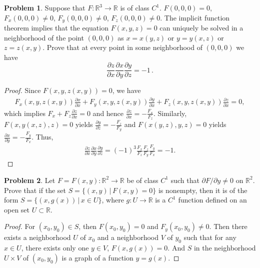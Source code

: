\documentclass[11pt]{article}
\theoremstyle{definition}
\newtheorem{problem}{Problem}
\theoremstyle{definition}
\begin{document}
\begin{problem}
Suppose that $F:\mathbb{R}^3\to\mathbb{R}$ is of class $C^1$.
$F(0,0,0)=0$, $F_x(0,0,0)\neq 0$, $F_y(0,0,0)\neq 0$,
$F_z(0,0,0)\neq 0$. The implicit function theorem implies
that the equation $F(x,y,z)=0$ can uniquely be solved in a
neighborhood of the point $(0,0,0)$
as $x=x(y,z)$ or $y=y(x,z)$ or $z=z(x,y)$. Prove that
at every point in some neighborhood of $(0,0,0)$ we have
$$
\frac{\partial z}{\partial x} \frac{\partial x}{\partial y}
\frac{\partial y}{\partial z}=-1\, .
$$
\end{problem}
\begin{proof}
Since $F(x,y,z(x,y)) = 0$, we have
\begin{align*}
    F_x(x,y,z(x,y))\frac{\partial x}{\partial x} + F_y(x,y,z(x,y))\frac{\partial y}{\partial x} + 
    F_z(x,y,z(x,y))\frac{\partial z}{\partial x} = 0,
\end{align*}
which implies $F_x + F_z \frac{\partial z}{\partial x} = 0$ and hence $\frac{\partial z}{\partial x} = - \frac{F_x}{F_z}$. Similarly, $F(x,y(x,z),z) = 0$ yields $\frac{\partial y}{\partial z} = - \frac{F_z}{F_y}$ and $F(x(y,z),y,z) = 0$ yields $\frac{\partial x}{\partial y} = - \frac{F_y}{F_x}$. Thus, 
\begin{align*}
    \frac{\partial z}{\partial x} \frac{\partial x}{\partial y} \frac{\partial y}{\partial z} = (-1)^3 \frac{F_x}{F_z} \frac{F_z}{F_y} \frac{F_y}{F_x} = -1.
\end{align*}
\end{proof}

\medskip


\begin{problem}
Let $F=F(x,y):\mathbb{R}^2\to\mathbb{R}$ be of class $C^1$ such that
$\partial F/\partial y\neq 0$ on $\mathbb{R}^2$.
Prove that if the set
$S=\{ (x,y)\, |\, F(x,y)=0\}$ is nonempty, then it is of the form
$S=\{ (x,g(x))\, |\, x\in U\}$, where $g:U\to\mathbb{R}$ is a $C^1$ function
defined on an open set $U\subset\mathbb{R}$.
\end{problem}
\begin{proof}
For $(x_0, y_0) \in S$, then $F(x_0, y_0) = 0$ and $F_y(x_0, y_0) \neq 0$. Then there exists a neighborhood $U$ of $x_0$ and a neighborhood $V$ of $y_0$ such that for any $x\in U$, there exists only one $y\in V$, $F(x, g(x)) = 0$. And $S$ in the neighborhood $U \times V$ of $(x_0, y_0)$ is a graph of a function $y = g(x)$. 
\end{proof}

\medskip
\end{document}
